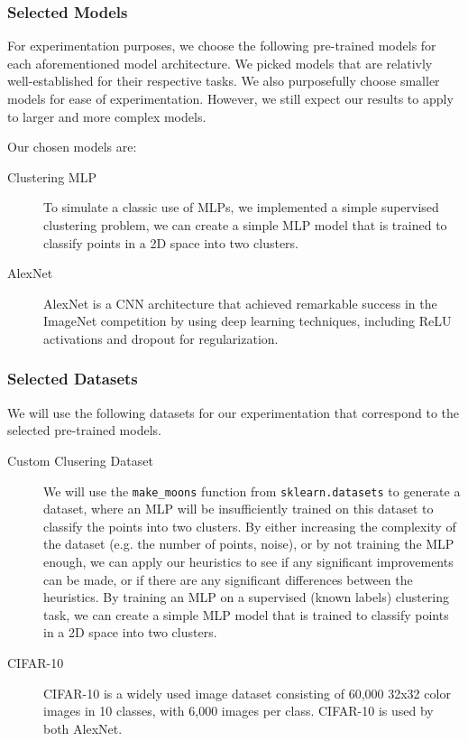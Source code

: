 \documentclass{article}
\begin{document}
\subsubsection{Selected Models}

For experimentation purposes, we choose the following pre-trained models for each aforementioned model architecture.
We picked models that are relativly well-established for their respective tasks.
We also purposefully choose smaller models for ease of experimentation.
However, we still expect our results to apply to larger and more complex models.

Our chosen models are:
\begin{description}
	\item[Clustering MLP] {
		To simulate a classic use of MLPs, we implemented a simple supervised clustering problem, we can create a simple MLP model that is trained to classify points in a 2D space into two clusters.
		}
	\item[AlexNet \cite{alexnet}] AlexNet is a CNN architecture that achieved remarkable success in the ImageNet competition by using deep learning techniques, including ReLU activations and dropout for regularization.
\end{description}

\subsubsection{Selected Datasets}
We will use the following datasets for our experimentation that correspond to the selected pre-trained models.

\begin{description}
	\item[Custom Clusering Dataset] {
		We will use the \texttt{make\_moons} function from \texttt{sklearn.datasets} to generate a dataset, where an MLP will be insufficiently trained on this dataset to classify the points into two clusters.
		By either increasing the complexity of the dataset (e.g. the number of points, noise), or by not training the MLP enough, we can apply our heuristics to see if any significant improvements can be made, or if there are any significant differences between the heuristics.
		By training an MLP on a supervised (known labels) clustering task, we can create a simple MLP model that is trained to classify points in a 2D space into two clusters.
		}
	\item[CIFAR-10 \cite{cifar_10}] {
		CIFAR-10 is a widely used image dataset consisting of 60,000 32x32 color images in 10 classes, with 6,000 images per class.
		CIFAR-10 is used by both AlexNet.
		}
\end{description}
\end{document}
